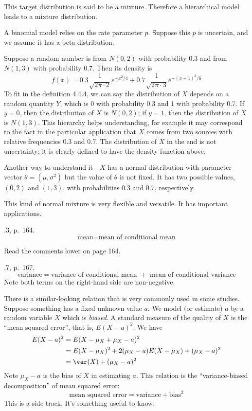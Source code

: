 \documentclass[12pt]{article}
\begin{document}
This target distribution is said to be a mixture. Therefore a
hierarchical model leads to a mixture distribution.

\example A binomial model relies on the rate parameter $p$.
Suppose this $p$ is uncertain, and we assume it has a beta distribution.

\example Suppose a random number is from $N(0, 2)$ with probability 0.3
and from $N(1, 3)$ with probability 0.7. Then its density is
\[
f(x) = 0.3 \frac{1}{\sqrt{2\pi \cdot 2}} e^{-x^2/4}
      + 0.7 \frac{1}{\sqrt{2\pi \cdot 3}} e^{-(x - 1)^2/6}
\]
To fit in the definition 4.4.4, we can say the distribution of $X$
depends on a random quantity $Y$, which is 0 with probability 0.3 and 1
with probability 0.7. If $y = 0$, then the distribution of $X$ is
$N(0,2)$; if $y = 1$, then the distribution of $X$ is $N(1,3)$.
This hierarchy helps understanding, for example it may correspond to the
fact in the particular application that $X$ comes from two sources with
relative frequencies 0.3 and 0.7.
The distribution of $X$ in the end is not uncertainty; it is clearly
defined to have the density function above.

Another way to understand it---$X$ has a normal distribution with
parameter vector $\theta = (\mu, \sigma^2)$ but the value of $\theta$ is
not fixed. It has two possible values, $(0, 2)$ and $(1, 3)$, with
probabilities 0.3 and 0.7, respectively.

This kind of normal mixture is very flexible and versatile.
It has important applications.

.3, p.~164.
\[
\text{mean} = \text{mean of conditional mean}
\]


Read the comments lower on page 164.

.7, p.~167.
\[
\text{variance}
= \text{variance of conditional mean }
    + \text{ mean of conditional variance}
\]
Note both terms on the right-hand side are non-negative.

There is a similar-looking relation that is very commonly used in some
studies. Suppose something has a fixed unknown value $a$.
We model (or estimate) $a$ by a random variable $X$ which is \emph{biased}.
A standard measure of the quality of $X$ is the ``mean squared error'',
that is, $E(X - a)^2$.
We have
\[\begin{split}
E(X - a)^2
&= E(X - \mu_X + \mu_X - a)^2
\\
&= E(X - \mu_X)^2 + 2(\mu_X - a)E(X - \mu_X) + (\mu_X - a)^2
\\
&= \var(X) + (\mu_X - a)^2
\end{split}
\]
Note $\mu_X - a$ is the bias of $X$ in estimating $a$.
This relation is the ``variance-biased decomposition'' of mean squared
error:
\[
\text{mean squared error}
= \text{variance} + \text{bias}^2
\]
This is a side track. It's something useful to know.
\end{document}
